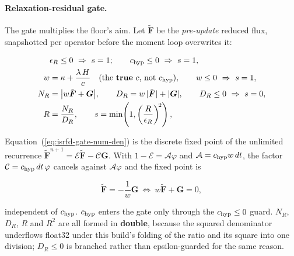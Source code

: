 \paragraph{Relaxation-residual gate.} The gate multiplies the floor's aim. Let
$\tilde{\boldsymbol{F}}$ be the
\emph{pre-update} reduced flux, snapshotted per operator before the moment loop
overwrites it:

\begin{align}
  &\epsilon_R \le 0 \ \Rightarrow\ s = 1; \qquad c_{\rm hyp} \le 0 \ \Rightarrow\ s = 1,
  \label{eq:isrfd-gate-early} \\
  w &= \kappa + \frac{\lambda\, H}{c} \quad \text{(the \textbf{true} $c$, not $c_{\rm hyp}$)},
  \qquad w \le 0 \ \Rightarrow\ s = 1,
  \label{eq:isrfd-gate-w} \\
  N_R &= \big| w\tilde{\boldsymbol{F}} + \boldsymbol{G} \big|,
  \qquad
  D_R = w\,|\tilde{\boldsymbol{F}}| + |\boldsymbol{G}|,
  \qquad D_R \le 0 \ \Rightarrow\ s = 0,
  \label{eq:isrfd-gate-num-den} \\
  R &= \frac{N_R}{D_R},
  \qquad
  s = \min\!\left(1, \left(\frac{R}{\epsilon_R}\right)^{\!2}\right),
  \label{eq:isrfd-gate-s}
\end{align}

Equation~(\ref{eq:isrfd-gate-num-den}) is the discrete fixed point of the
unlimited recurrence
$\tilde{\boldsymbol{F}}^{n+1} = \mathcal{E}\tilde{\boldsymbol{F}} - \mathcal{C}\boldsymbol{G}$.
With $1 - \mathcal{E} = \mathcal{A}\varphi$ and
$\mathcal{A} = c_{\rm hyp} w\, dt$, the factor $\mathcal{C} = c_{\rm hyp}\,dt\,\varphi$
cancels against $\mathcal{A}\varphi$ and the fixed point is

\begin{equation}
  \tilde{\boldsymbol{F}} = -\frac{1}{w}\boldsymbol{G}
  \ \Longleftrightarrow\ w\tilde{\boldsymbol{F}} + \boldsymbol{G} = 0,
  \label{eq:isrfd-gate-fp-reduced}
\end{equation}

independent of $c_{\rm hyp}$. $c_{\rm hyp}$ enters the gate only through
the $c_{\rm hyp} \le 0$ guard. $N_R$, $D_R$, $R$ and $R^2$ are all formed in
\textbf{double}, because the squared denominator underflows float32 under this
build's folding of the ratio and its square into one division; $D_R \le 0$ is
branched rather than epsilon-guarded for the same reason.

